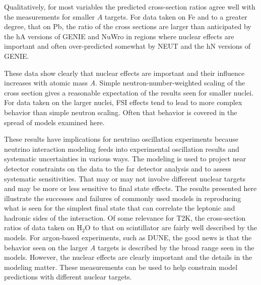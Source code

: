 \documentclass[aps,prd,twocolumn,showpacs,superscriptaddress,floatfix]{revtex4-2}  %
\begin{document}
Qualitatively, for most variables the  predicted cross-section ratios 
agree well with the measurements for smaller $A$ targets.  For data taken on Fe and to a greater degree, that on Pb, the ratio of the cross sections are larger than anticipated by the hA versions of GENIE and NuWro in regions where nuclear effects are important and often over-predicted somewhat by NEUT and the hN versions of GENIE.  

These data show clearly that nuclear effects are important and their influence increases with  atomic mass {\it A}.  Simple neutron-number-weighted scaling of the cross section gives a reasonable expectation of the results seen for smaller nuclei.  For data taken on the larger nuclei, FSI effects tend to lead to more complex behavior than simple neutron scaling.  Often that behavior is covered in the spread of models examined here. 

These results have implications for neutrino oscillation experiments because neutrino interaction modeling feeds into experimental oscillation results and systematic uncertainties in various ways.  The modeling is used to project near detector constraints on the data to the far detector analysis and to assess systematic sensitivities.  That may or may not involve different nuclear targets and may be more or less sensitive to final state effects.  The results presented here illustrate the successes and failures of commonly used models in reproducing what is seen for the simplest final state that can correlate the leptonic and hadronic sides of the interaction.  Of some relevance for T2K, the cross-section ratios of data taken on H$_{2}$O to that on scintillator are fairly well described by the models.  For argon-based experiments, such as DUNE, the good news is that the behavior seen on the larger {\it A} targets is described by the broad range seen in the models.  However, the nuclear effects are clearly important and the details in the modeling matter.  These measurements can be used to help constrain model predictions with different nuclear targets.
\end{document}
